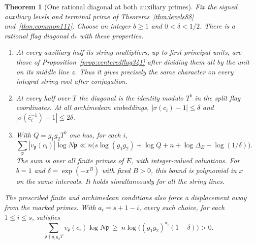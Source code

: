 \documentclass[a4paper,11pt]{article}
\newtheorem{theorem}[proposition]{Theorem}
\theoremstyle{definition}
\theoremstyle{remark}
\numberwithin{equation}{section}
\begin{document}
\begin{theorem}[One rational diagonal at both auxiliary primes]\leavevmode\label{thm:rationalflag342}
Fix the signed auxiliary levels and terminal prime of
Theorems~\ref{thm:levels88} and~\ref{thm:common111}. Choose an
integer $b\ge1$ and $0<\delta<1/2$. There is a rational flag
diagonal $d_*$ with these properties.
\begin{enumerate}
\item At every auxiliary half its string multipliers, up to first
principal units, are those of Proposition~\ref{prop:centeredflag341}
after dividing them all by the unit on its middle line $z$. Thus
it gives precisely the same character on every integral string root
after conjugation.
\item At every half over $T$ the diagonal is the identity modulo
$T^b$ in the split flag coordinates. At all archimedean embeddings,
$|\sigma(c_i)-1|\le\delta$ and
$|\sigma(\bar c_i^{-1})-1|\le2\delta$.
\item With $Q=g_1g_2T^b$ one has, for each $i$,
\[
 \sum_{\mathfrak p}|v_{\mathfrak p}(c_i)|\log N\mathfrak p
 \ll n\bigl(s\log(g_1g_2)+\log Q+n+\log\Delta_E+\log(1/\delta)\bigr).
\]
The sum is over all finite primes of $E$, with integer-valued
valuations. For $b=1$ and $\delta=\exp(-x^B)$ with fixed $B>0$,
this bound is polynomial in $x$ on the same intervals. It holds
simultaneously for all the string lines.
\end{enumerate}
The prescribed finite and archimedean conditions also force a
displacement away from the marked primes. With $a_i=s+1-i$, every
such choice, for each $1\le i\le s$, satisfies
\[
 \sum_{\mathfrak p\nmid g_1g_2T}v_{\mathfrak p}(c_i)\log N\mathfrak p
 \ \ge\ n\log\bigl((g_1g_2)^{a_i}(1-\delta)\bigr)>0 .
\]
\end{theorem}
\end{document}
